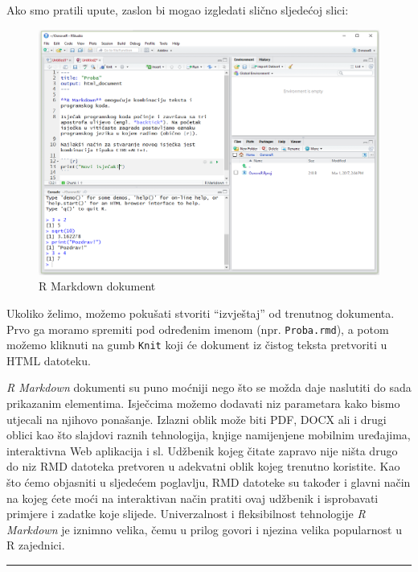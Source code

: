 \documentclass[]{book}
\theoremstyle{definition}
\theoremstyle{definition}
\theoremstyle{definition}
\theoremstyle{remark}
\begin{document}
Ako smo pratili upute, zaslon bi mogao izgledati slično sljedećoj slici:

\begin{figure}
\centering
\includegraphics{figures/RStudio4.png}
\caption{\label{fig:unnamed-chunk-6}R Markdown dokument}
\end{figure}

Ukoliko želimo, možemo pokušati stvoriti ``izvještaj'' od trenutnog
dokumenta. Prvo ga moramo spremiti pod određenim imenom (npr.
\texttt{Proba.rmd}), a potom možemo kliknuti na gumb \texttt{Knit} koji
će dokument iz čistog teksta pretvoriti u HTML datoteku.

\emph{R Markdown} dokumenti su puno moćniji nego što se možda daje
naslutiti do sada prikazanim elementima. Isječcima možemo dodavati niz
parametara kako bismo utjecali na njihovo ponašanje. Izlazni oblik može
biti PDF, DOCX ali i drugi oblici kao što slajdovi raznih tehnologija,
knjige namijenjene mobilnim uređajima, interaktivna Web aplikacija i sl.
Udžbenik kojeg čitate zapravo nije ništa drugo do niz RMD datoteka
pretvoren u adekvatni oblik kojeg trenutno koristite. Kao što ćemo
objasniti u sljedećem poglavlju, RMD datoteke su također i glavni način
na kojeg ćete moći na interaktivan način pratiti ovaj udžbenik i
isprobavati primjere i zadatke koje slijede. Univerzalnost i
fleksibilnost tehnologije \emph{R Markdown} je iznimno velika, čemu u
prilog govori i njezina velika popularnost u R zajednici.

\begin{center}\rule{0.5\linewidth}{\linethickness}\end{center}
\end{document}
